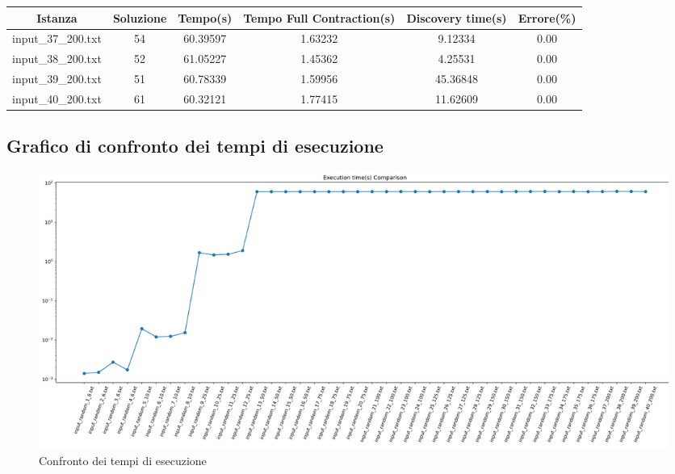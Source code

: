 \begin{center}
	\begin{tabular}{|c|c|c|c|c|c|}
		\hline
		\parbox{2cm}{\centering Istanza} & {Soluzione} & {Tempo(s)} & \parbox{2.75cm}{\vspace{.1cm}\centering Tempo Full Contraction(s)\vspace{.1cm}} & \parbox{2cm}{\centering Discovery time(s)} & {Errore(\%)}\\\hline
		input\_37\_200.txt & 54 & 60.39597 & 1.63232 & 9.12334 & 0.00\\\hline
		input\_38\_200.txt & 52 & 61.05227 & 1.45362 & 4.25531 & 0.00\\\hline
		input\_39\_200.txt & 51 & 60.78339 & 1.59956 & 45.36848 & 0.00\\\hline
		input\_40\_200.txt & 61 & 60.32121 & 1.77415 & 11.62609 & 0.00\\\hline
	\end{tabular}
\end{center}

\subsection{Grafico di confronto dei tempi di esecuzione}
\begin{center}
	\begin{figure}[H]
		\centering
		\hspace{-1cm}\includegraphics[width=\linewidth]{Img/exec_time_graph.jpg}
		\caption{Confronto dei tempi di esecuzione}
	\end{figure}
\end{center}

